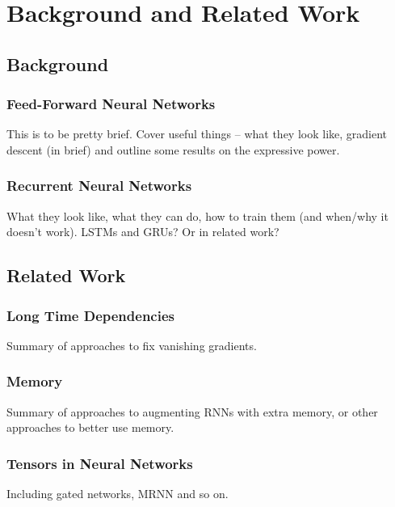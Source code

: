 \chapter{Background and Related Work}\label{C:bg}
\section{Background}
\subsection{Feed-Forward Neural Networks}
This is to be pretty brief. Cover useful things -- what they look like, gradient descent
(in brief) and outline some results on the expressive power.
\subsection{Recurrent Neural Networks}
What they look like, what they can do, how to train them (and when/why it doesn't work).
LSTMs and GRUs? Or in related work?

\section{Related Work}
\subsection{Long Time Dependencies}
Summary of approaches to fix vanishing gradients.
\subsection{Memory}
Summary of approaches to augmenting RNNs with extra memory, or other approaches to better
use memory.
\subsection{Tensors in Neural Networks}
Including gated networks, MRNN and so on.
